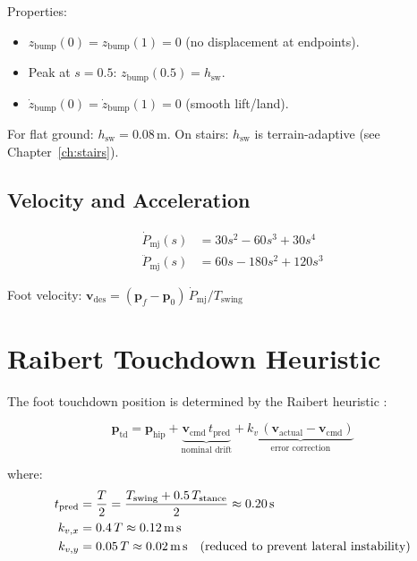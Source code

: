 \documentclass[12pt,a4paper]{report}
\newcommand{\vect}[1]{\bm{#1}}
\begin{document}
Properties:
\begin{itemize}[noitemsep]
  \item $z_\text{bump}(0) = z_\text{bump}(1) = 0$ (no displacement at endpoints).
  \item Peak at $s = 0.5$: $z_\text{bump}(0.5) = h_\text{sw}$.
  \item $\dot{z}_\text{bump}(0) = \dot{z}_\text{bump}(1) = 0$ (smooth lift/land).
\end{itemize}

For flat ground: $h_\text{sw} = 0.08\,\text{m}$.  On stairs: $h_\text{sw}$
is terrain-adaptive (see Chapter~\ref{ch:stairs}).

\subsection{Velocity and Acceleration}

\begin{align}
    \dot{P}_\text{mj}(s) &= 30s^2 - 60s^3 + 30s^4 \\
    \ddot{P}_\text{mj}(s) &= 60s - 180s^2 + 120s^3
\end{align}

Foot velocity: $\vect{v}_\text{des} = (\vect{p}_f - \vect{p}_0)\,\dot{P}_\text{mj}/T_\text{swing}$

\section{Raibert Touchdown Heuristic}

The foot touchdown position is determined by the Raibert heuristic
\cite{raibert1986}:

\begin{equation}
    \vect{p}_\text{td} = \vect{p}_\text{hip} +
    \underbrace{\vect{v}_\text{cmd}\,t_\text{pred}}_{\text{nominal drift}} +
    \underbrace{k_v\,(\vect{v}_\text{actual} - \vect{v}_\text{cmd})}_{\text{error correction}}
    \label{eq:raibert}
\end{equation}

where:
\begin{align}
    t_\text{pred} &= \frac{T}{2} = \frac{T_\text{swing} + 0.5\,T_\text{stance}}{2}
    \approx 0.20\,\text{s} \\
    k_{v,x} &= 0.4\,T \approx 0.12\,\text{m\,s} \\
    k_{v,y} &= 0.05\,T \approx 0.02\,\text{m\,s}  \quad\text{(reduced to prevent lateral instability)}
\end{align}
\end{document}
